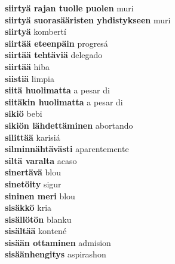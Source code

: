 \textbf{ siirtyä rajan tuolle puolen  } muri \\
\textbf{ siirtyä suorasääristen yhdistykseen  } muri \\
\textbf{ siirtyä  } kombertí \\
\textbf{ siirtää eteenpäin  } progresá \\
\textbf{ siirtää tehtäviä  } delegado \\
\textbf{ siirtää  } hiba \\
\textbf{ siistiä  } limpia \\
\textbf{ siitä huolimatta  } a pesar di \\
\textbf{ siitäkin huolimatta  } a pesar di \\
\textbf{ sikiö  } bebi \\
\textbf{ sikiön lähdettäminen  } abortando \\
\textbf{ silittää  } karisiá \\
\textbf{ silminnähtävästi  } aparentemente \\
\textbf{ siltä varalta  } acaso \\
\textbf{ sinertävä  } blou \\
\textbf{ sinetöity  } sigur \\
\textbf{ sininen meri  } blou \\
\textbf{ sisäkkö  } kria \\
\textbf{ sisällötön  } blanku \\
\textbf{ sisältää  } kontené \\
\textbf{ sisään ottaminen  } admision \\
\textbf{ sisäänhengitys  } aspirashon \\

